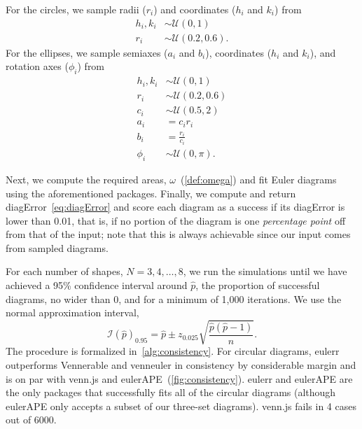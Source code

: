 \documentclass[
  oneside,
  openany,
  numbers=noendperiod,
  parskip=half,
  bibliography=totoc
]{scrbook}\usepackage[]{graphicx}\usepackage{xcolor}
\newcommand{\pkg}[1]{{\fontseries{b}\selectfont #1}}
\begin{document}
For the circles, we sample radii ($r_i$) and coordinates ($h_i$ and $k_i$) from
\begin{equation}
\begin{aligned}
h_i,k_i & \sim \mathcal{U}(0, 1)\\
r_i     & \sim \mathcal{U}(0.2, 0.6).
\end{aligned}
\label{eq:consistencyCircles}
\end{equation}
For the ellipses, we sample semiaxes ($a_i$ and $b_i$), coordinates
($h_i$ and $k_i$), and rotation axes ($\phi_i$) from
\begin{equation}
\begin{aligned}
h_i,k_i & \sim \mathcal{U}(0, 1)\\
r_i     & \sim \mathcal{U}(0.2, 0.6)\\
c_i     & \sim \mathcal{U}(0.5, 2)\\
a_i     & = c_ir_i\\
b_i     & = \frac{r_i}{c_i}\\
\phi_i  & \sim \mathcal{U}(0, \pi).
\end{aligned}
\label{eq:consistencyEllipses}
\end{equation}

Next, we compute the required areas, $\omega$~(\cref{def:omega})
and fit Euler diagrams using the aforementioned packages. Finally,
we compute and return diagError~\eqref{eq:diagError} and score each
diagram as a success if its diagError is lower than 0.01, that is,
if no portion of the diagram is one \emph{percentage point} off from that of the
input; note that this is always achievable since our input comes
from sampled diagrams.



For each number of shapes, $N=3,4,\dots,8$, we run the simulations until we have
achieved a 95\% confidence interval around $\hat{p}$, the proportion of
successful diagrams, no wider than 0, and for a minimum of 1,000 iterations. We
use the normal approximation interval,
\begin{equation}
\mathcal{I}(\hat{p})_{0.95} = \hat{p} \pm z_{0.025}\sqrt{\frac{\hat{p}(\hat{p}-1)}{n}}.
\label{eq:prop-ci}
\end{equation}
The procedure is formalized in~\cref{alg:consistency}. For circular diagrams,
\pkg{eulerr} outperforms \pkg{Vennerable} and \pkg{venneuler} in
consistency by considerable margin and is on par with \pkg{venn.js} and
\pkg{eulerAPE}~(\cref{fig:consistency}). \pkg{eulerr} and \pkg{eulerAPE} are
the only packages that successfully fits all of the circular diagrams (although
\pkg{eulerAPE} only accepts a subset of our three-set diagrams).
\pkg{venn.js} fails in 4 cases out of
6000.
\end{document}
